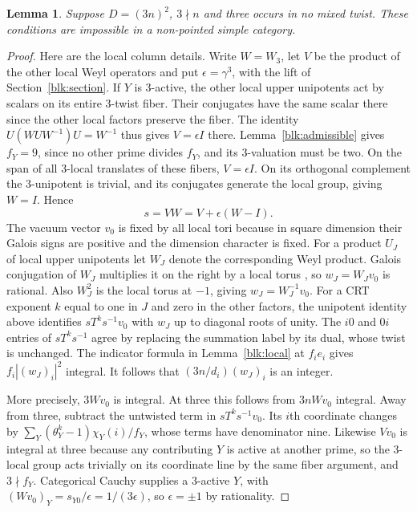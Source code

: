 \documentclass[11pt]{amsart}
\numberwithin{equation}{section}
\newtheorem{lemma}[theorem]{Lemma}
\begin{document}
\begin{lemma}\label{isolated}
Suppose $D=(3n)^2$, $3\nmid n$ and three occurs in no mixed twist.
These conditions are impossible in a non-pointed simple category.
\end{lemma}
\begin{proof}
Here are the local column details. Write $W=W_3$, let $V$ be the
product of the other local Weyl operators and put $\epsilon=\gamma^3$,
with the lift of Section~\ref{blk:section}. If $Y$ is 3-active,
the other local upper unipotents act by scalars on its entire
3-twist fiber. Their conjugates have the same scalar there since
the other local factors preserve the fiber. The identity
$U(WUW^{-1})U=W^{-1}$ thus gives $V=\epsilon I$ there.
Lemma~\ref{blk:admissible} gives $f_Y=9$, since no other prime divides
$f_Y$, and its 3-valuation must be two. On the span of all
3-local translates of these fibers, $V=\epsilon I$. On its
orthogonal complement the 3-unipotent is trivial, and its
conjugates generate the local group, giving $W=I$. Hence
\[
                     s=VW=V+\epsilon(W-I).
\]
The vacuum vector $v_0$ is fixed by all local tori because in square
dimension their Galois signs are positive and the dimension
character is fixed. For a product $U_J$ of local upper unipotents
let $W_J$ denote the corresponding Weyl product. Galois conjugation
of $W_J$ multiplies it on the right by a local torus
\cite[Theorem II and Remark 4.5]{DLNCongruence}, so
$w_J=W_Jv_0$ is rational. Also $W_J^2$ is the local torus at
$-1$, giving $w_J=W_J^{-1}v_0$. For a CRT exponent $k$ equal
to one in $J$ and zero in the other factors, the unipotent identity
above identifies $sT^ks^{-1}v_0$ with $w_J$ up to diagonal roots
of unity. The $i0$ and $0i$ entries of $sT^ks^{-1}$ agree by
replacing the summation label by its dual, whose twist is unchanged.
The indicator formula in Lemma~\ref{blk:local} at
$f_i e_i$ gives $f_i|(w_J)_i|^2$ integral. It follows that
$(3n/d_i)(w_J)_i$ is an integer.

More precisely, $3Wv_0$ is integral. At three this follows from
$3nWv_0$ integral. Away from three, subtract the untwisted term in
$sT^ks^{-1}v_0$. Its $i$th coordinate changes by
$\sum_Y (\theta_Y^k-1)\chi_Y(i)/f_Y$, whose terms have
denominator nine. Likewise $Vv_0$ is integral at three because any
contributing $Y$ is active at another prime, so the 3-local group
acts trivially on its coordinate line by the same fiber argument,
and $3\nmid f_Y$. Categorical Cauchy supplies a 3-active $Y$, with
$(Wv_0)_Y=s_{Y0}/\epsilon=1/(3\epsilon)$, so
$\epsilon=\pm1$ by rationality.


\end{proof}
\end{document}
